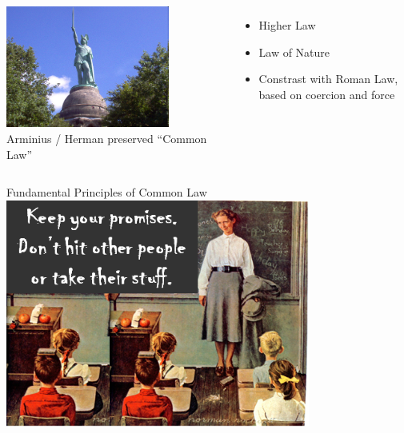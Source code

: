 \begin{frame}
    \begin{columns}[onlytextwidth]
            \centering
            \includegraphics[width=0.75\textwidth]{img/herman2.png} \\

            Arminius / Herman preserved ``Common Law''
            \pause
            \begin{itemize}
                \item Higher Law
                \pause
                \item Law of Nature
                \pause
                \item Constrast with Roman Law, based on coercion and force
            \end{itemize}
    \end{columns}
\end{frame}

\begin{frame}{Fundamental Principles of Common Law}
    \centering
    \includegraphics[width=0.75\textwidth]{img/schoolroom.png} \\
\end{frame}

